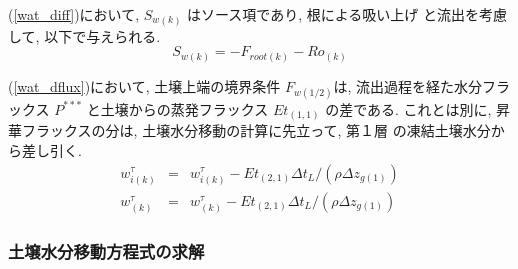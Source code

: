 (\ref{wat_diff})において, $S_{w(k)}$ はソース項であり, 根による吸い上げ
と流出を考慮して, 以下で与えられる.
\begin{equation}
 S_{w(k)} = - F_{root(k)} - Ro_{(k)}
\end{equation}

(\ref{wat_dflux})において,
土壌上端の境界条件 $F_{w(1/2)}$は, 流出過程を経た水分フラックス
$P^{***}$ と土壌からの蒸発フラックス $Et_{(1,1)}$ の差である.
これとは別に, 昇華フラックスの分は, 土壌水分移動の計算に先立って, 第１層
の凍結土壌水分から差し引く.
\begin{eqnarray}
 w_{i(k)}^{\tau} &=& w_{i(k)}^{\tau} - Et_{(2,1)} \Delta t_L /(\rho \Delta z_{g(1)})\\
 w_{(k)}^{\tau} &=& w_{(k)}^{\tau} - Et_{(2,1)} \Delta t_L /(\rho \Delta z_{g(1)})
\end{eqnarray}

\subsubsection{土壌水分移動方程式の求解}

